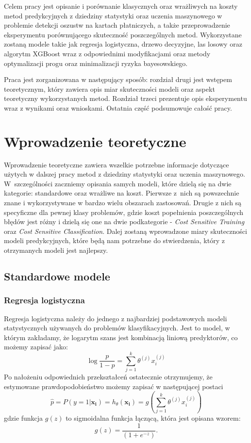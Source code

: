 \documentclass[inzynierska]{pwr_wmat_praca_dyplomowa}
\theoremstyle{plain}
\numberwithin{theorem}{chapter}
\theoremstyle{definition}
\numberwithin{theorem}{chapter}
\begin{document}
Celem pracy jest opisanie i porównanie klasycznych oraz wrażliwych na koszty metod predykcyjnych z dziedziny statystyki oraz uczenia maszynowego w problemie detekcji oszustw na kartach płatniczych, a także przeprowadzenie eksperymentu porównującego skuteczność poszczególnych metod. Wykorzystane zostaną modele takie jak regresja logistyczna, drzewo decyzyjne, las losowy oraz algorytm XGBoost wraz z odpowiednimi modyfikacjami oraz metody optymalizacji progu oraz minimalizacji ryzyka bayesowskiego.

Praca jest zorganizowana w następujący sposób: rozdział drugi jest wstępem teoretycznym, który zawiera opis miar skuteczności modeli oraz aspekt teoretyczny wykorzystanych metod. Rozdział trzeci prezentuje opis eksperymentu wraz z wynikami oraz wnioskami. Ostatnia część podsumowuje całość pracy.

\chapter{Wprowadzenie teoretyczne}

Wprowadzenie teoretyczne zawiera wszelkie potrzebne informacje dotyczące użytych w dalszej pracy metod z dziedziny statystyki oraz uczenia maszynowego. W~szczególności zaczniemy opisania samych modeli, które dzielą się na dwie kategorie: standardowe oraz wrażliwe na koszt. Pierwsze z~nich są powszechnie znane i wykorzystywane w bardzo wielu obszarach zastosowań. Drugie z nich są specyficzne dla pewnej klasy problemów, gdzie koszt popełnienia poszczególnych błędów jest różny i dzielą się one na dwie podkategorie - \textit{Cost Sensitive Training} oraz \textit{Cost Sensitive Classification}. Dalej zostaną wprowadzone miary skuteczności modeli predykcyjnych, które będą nam potrzebne do stwierdzenia, który z otrzymanych modeli jest najlepszy.


\section{Standardowe modele}



\subsection{Regresja logistyczna}
\label{reg-log}
Regresja logistyczna należy do jednego z najbardziej podstawowych modeli statystycznych używanych do problemów klasyfikacyjnych. Jest to model, w którym zakładamy, że logarytm szans jest kombinacją liniową predyktorów, co możemy zapisać jako:
$$ \log{\frac{p}{1 - p}} = \sum_{j=1}^k \theta^{(j)}x_i^{(j)} $$
Po nałożeniu odpowiednich przekształceń ostatecznie otrzymujemy, że estymowane prawdopodobieństwo możemy zapisać w następującej postaci
\begin{equation}
	\hat{p} = P(y=1|\boldsymbol{x_i}) = h_{\theta}(\boldsymbol{x_i}) = g\left(\sum_{j=1}^k \theta^{(j)}x_i^{(j)} \right)
\end{equation} 
gdzie funkcja $g(z)$ to sigmoidalna funkcja łączącą, która jest opisana wzorem: 
$$ g(z) = \frac{1}{(1+e^{-z})} \text{.}$$
\end{document}
